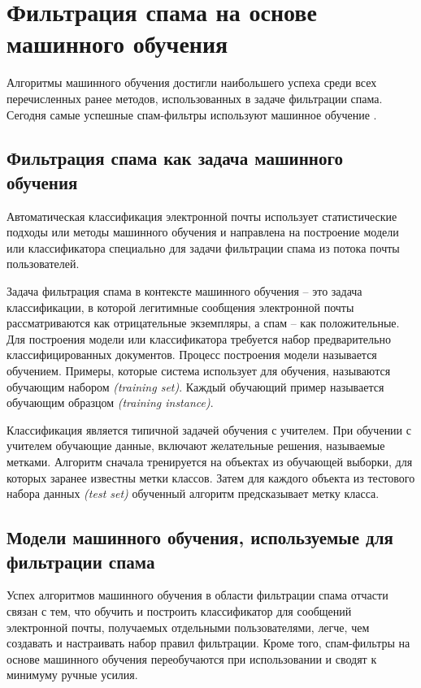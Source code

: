 \section{Фильтрация спама на основе машинного обучения}\label{Section:ML}
Алгоритмы машинного обучения достигли наибольшего успеха среди всех
перечисленных ранее методов, использованных в задаче фильтрации спама.
Сегодня самые успешные спам-фильтры используют машинное обучение \cite{filters}.

\subsection{Фильтрация спама как задача машинного обучения}
Автоматическая классификация электронной почты использует статистические подходы
или методы машинного обучения и направлена ​​на построение модели или классификатора
специально для задачи фильтрации спама из потока почты пользователей.

Задача фильтрация спама в контексте машинного обучения -- это задача классификации,
в которой легитимные сообщения электронной почты рассматриваются как отрицательные
экземпляры, а спам -- как положительные. Для построения модели или классификатора
требуется набор предварительно классифицированных документов. Процесс построения
модели называется обучением. Примеры, которые система использует для обучения,
называются обучающим набором \emph{(training set)}. Каждый обучающий при­мер называется
обучающим образцом \emph{(training instance)}.

Классификация является типичной задачей обучения с учителем. При обучении с учителем
обучающие данные, включают желательные решения, называемые метками. Алгоритм сначала
тренируется на объектах из обучающей выборки, для которых заранее известны метки классов.
Затем для каждого объекта из тестового набора данных \emph{(test set)} обученный алгоритм
предсказывает метку класса.

\subsection{Модели машинного обучения, используемые для фильтрации спама}\label{ML}

Успех алгоритмов машинного обучения в области фильтрации спама отчасти связан с тем, что
обучить и построить классификатор для сообщений электронной почты, получаемых отдельными
пользователями, легче,  чем создавать и настраивать набор правил фильтрации. Кроме того,
спам-фильтры на основе машинного обучения переобучаются при использовании и сводят к
минимуму ручные усилия.

